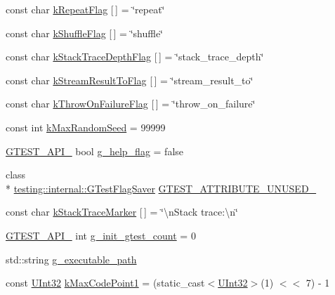 \begin{DoxyCompactItemize}
\item 
const char \hyperlink{namespacetesting_1_1internal_a3e61db2ed34f0c3f0bc75745ea4803bf}{k\-Repeat\-Flag} \mbox{[}$\,$\mbox{]} = \char`\"{}repeat\char`\"{}
\item 
const char \hyperlink{namespacetesting_1_1internal_adcad7638dc48dd85e3f450f111213951}{k\-Shuffle\-Flag} \mbox{[}$\,$\mbox{]} = \char`\"{}shuffle\char`\"{}
\item 
const char \hyperlink{namespacetesting_1_1internal_aa3b00898fa2231d4e19ad0b1411c6261}{k\-Stack\-Trace\-Depth\-Flag} \mbox{[}$\,$\mbox{]} = \char`\"{}stack\-\_\-trace\-\_\-depth\char`\"{}
\item 
const char \hyperlink{namespacetesting_1_1internal_aaca973772e7b80fb0e1413855d9aad8d}{k\-Stream\-Result\-To\-Flag} \mbox{[}$\,$\mbox{]} = \char`\"{}stream\-\_\-result\-\_\-to\char`\"{}
\item 
const char \hyperlink{namespacetesting_1_1internal_ab457c8178b128b850fbb9f55b2bf1e5b}{k\-Throw\-On\-Failure\-Flag} \mbox{[}$\,$\mbox{]} = \char`\"{}throw\-\_\-on\-\_\-failure\char`\"{}
\item 
const int \hyperlink{namespacetesting_1_1internal_a41bd421ace53d23dbe85d9618c3afaee}{k\-Max\-Random\-Seed} = 99999
\item 
\hyperlink{gtest-port_8h_aa73be6f0ba4a7456180a94904ce17790}{G\-T\-E\-S\-T\-\_\-\-A\-P\-I\-\_\-} bool \hyperlink{namespacetesting_1_1internal_a93a772f5e51973b105d91cbb66a203f4}{g\-\_\-help\-\_\-flag} = false
\item 
class \\*
\hyperlink{classtesting_1_1internal_1_1_g_test_flag_saver}{testing\-::internal\-::\-G\-Test\-Flag\-Saver} \hyperlink{namespacetesting_1_1internal_a581ac897511489c75a06aa328dcfb62f}{G\-T\-E\-S\-T\-\_\-\-A\-T\-T\-R\-I\-B\-U\-T\-E\-\_\-\-U\-N\-U\-S\-E\-D\-\_\-}
\item 
const char \hyperlink{namespacetesting_1_1internal_abb38528ca6a45df265b19f5ccb3d16d9}{k\-Stack\-Trace\-Marker} \mbox{[}$\,$\mbox{]} = \char`\"{}\textbackslash{}n\-Stack trace\-:\textbackslash{}n\char`\"{}
\item 
\hyperlink{gtest-port_8h_aa73be6f0ba4a7456180a94904ce17790}{G\-T\-E\-S\-T\-\_\-\-A\-P\-I\-\_\-} int \hyperlink{namespacetesting_1_1internal_ac2e10dd08851d714ed2cc52e0b0d72b9}{g\-\_\-init\-\_\-gtest\-\_\-count} = 0
\item 
std\-::string \hyperlink{namespacetesting_1_1internal_a378aeb636e57d85615c466189e84417b}{g\-\_\-executable\-\_\-path}
\item 
const \hyperlink{namespacetesting_1_1internal_a436defbb8e92c8e94e33ebcc86f278ba}{U\-Int32} \hyperlink{namespacetesting_1_1internal_a128515c8ed6c0fe98e498c8042da2060}{k\-Max\-Code\-Point1} = (static\-\_\-cast$<$\hyperlink{namespacetesting_1_1internal_a436defbb8e92c8e94e33ebcc86f278ba}{U\-Int32}$>$(1) $<$$<$ 7) -\/ 1
$$
\end{DoxyCompactItemize}

